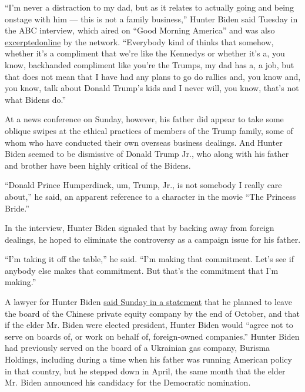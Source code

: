 ``I'm never a distraction to my dad, but as it relates to actually going
and being onstage with him --- this is not a family business,'' Hunter
Biden said Tuesday in the ABC interview, which aired on ``Good Morning
America'' and was also
\href{https://abcnews.go.com/Politics/exclusive-hiding-plain-sight-hunter-biden-defends-foreign/story?id=66275416}{excerpted}\textbf{\href{https://abcnews.go.com/Politics/exclusive-hiding-plain-sight-hunter-biden-defends-foreign/story?id=66275416}{}}\href{https://abcnews.go.com/Politics/exclusive-hiding-plain-sight-hunter-biden-defends-foreign/story?id=66275416}{online}
by the network. ``Everybody kind of thinks that somehow, whether it's a
compliment that we're like the Kennedys or whether it's a, you know,
backhanded compliment like you're the Trumps, my dad has a, a job, but
that does not mean that I have had any plans to go do rallies and, you
know and, you know, talk about Donald Trump's kids and I never will, you
know, that's not what Bidens do.''

At a news conference on Sunday, however, his father did appear to take
some oblique swipes at the ethical practices of members of the Trump
family, some of whom who have conducted their own overseas business
dealings. And Hunter Biden seemed to be dismissive of Donald Trump Jr.,
who along with his father and brother have been highly critical of the
Bidens.

``Donald Prince Humperdinck, um, Trump, Jr., is not somebody I really
care about,'' he said, an apparent reference to a character in the movie
``The Princess Bride.''

In the interview, Hunter Biden signaled that by backing away from
foreign dealings, he hoped to eliminate the controversy as a campaign
issue for his father.

``I'm taking it off the table,'' he said. ``I'm making that commitment.
Let's see if anybody else makes that commitment. But that's the
commitment that I'm making.''

A lawyer for Hunter Biden
\href{https://www.nytimes.com/2019/10/13/us/politics/hunter-biden-china.html}{said
Sunday in a statement} that he planned to leave the board of the Chinese
private equity company by the end of October, and that if the elder Mr.
Biden were elected president, Hunter Biden would ``agree not to serve on
boards of, or work on behalf of, foreign-owned companies.'' Hunter Biden
had previously served on the board of a Ukrainian gas company, Burisma
Holdings, including during a time when his father was running American
policy in that country, but he stepped down in April, the same month
that the elder Mr. Biden announced his candidacy for the Democratic
nomination.

